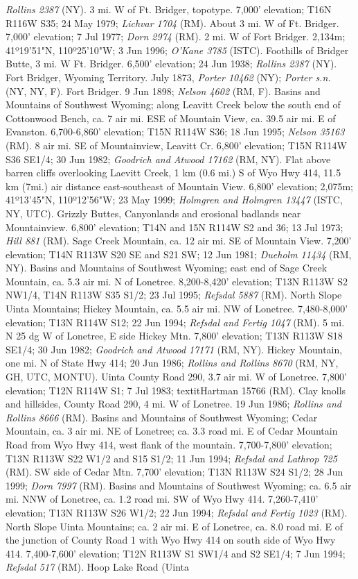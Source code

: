 \textit{Rollins 2387} (NY). 3 mi. W of Ft. Bridger, topotype.	7,000' elevation; T16N R116W S35; 24 May 1979; \textit{Lichvar 1704} (RM).  About 3 mi. W of Ft. Bridger. 7,000' elevation;	7 Jul 1977; \textit{Dorn 2974} (RM).  2 mi. W of Fort Bridger. 2,134m; 41º19'51"N, 110º25'10"W; 3 Jun 1996; \textit{O'Kane 3785} (ISTC).  Foothills of Bridger Butte, 3 mi. W Ft. Bridger. 6,500' elevation; 24 Jun 1938; \textit{Rollins 2387} (NY).  Fort Bridger, Wyoming Territory. July 1873, \textit{Porter 10462} (NY); \textit{Porter s.n.} (NY, NY, F).  Fort Bridger. 9 Jun 1898; \textit{Nelson 4602} (RM, F).  Basins and Mountains of Southwest Wyoming; along Leavitt Creek below the south end of Cottonwood Bench, ca. 7 air mi. ESE of Mountain View, ca. 39.5 air mi. E of Evanston.	6,700-6,860' elevation; T15N R114W S36; 18 Jun 1995; \textit{Nelson 35163} (RM).  8 air mi. SE of Mountainview, Leavitt Cr. 6,800' elevation; T15N R114W S36 SE1/4; 30 Jun 1982; \textit{Goodrich and Atwood 17162} (RM, NY).  Flat above barren cliffs overlooking Laevitt Creek, 1 km (0.6 mi.) S of Wyo Hwy 414, 11.5 km (7mi.) air distance east-southeast of Mountain View. 6,800' elevation; 2,075m; 41º13'45"N, 110º12'56"W; 23 May 1999; \textit{Holmgren and Holmgren 13447} (ISTC, NY, UTC).  Grizzly Buttes, Canyonlands and erosional badlands near Mountainview. 6,800' elevation;	T14N and 15N R114W S2 and 36; 13 Jul 1973; \textit{Hill 881} (RM).  Sage Creek Mountain, ca. 12 air mi. SE of Mountain View. 7,200' elevation; T14N R113W S20 SE and S21 SW; 12 Jun 1981; \textit{Dueholm 11434} (RM, NY).  Basins and Mountains of Southwest Wyoming; east end of Sage Creek Mountain, ca. 5.3 air mi. N of Lonetree. 8,200-8,420' elevation; T13N R113W S2 NW1/4, T14N R113W S35 S1/2; 23 Jul 1995; \textit{Refsdal 5887} (RM).  North Slope Uinta Mountains; Hickey Mountain, ca. 5.5 air mi. NW of Lonetree. 7,480-8,000' elevation; T13N R114W S12; 22 Jun 1994; \textit{Refsdal and Fertig 1047} (RM).  5 mi. N 25 dg W of Lonetree, E side Hickey Mtn. 7,800' elevation; T13N R113W S18 SE1/4; 30 Jun 1982; \textit{Goodrich and Atwood 17171} (RM, NY).  Hickey Mountain, one mi. N of State Hwy 414; 20 Jun 1986; \textit{Rollins and Rollins 8670} (RM, NY, GH, UTC, MONTU).  Uinta County Road 290, 3.7 air mi. W of Lonetree. 7,800' elevation; T12N R114W S1; 7 Jul 1983; textit{Hartman 15766} (RM).  Clay knolls and hillsides, County Road 290, 4 mi. W of Lonetree. 19 Jun 1986; \textit{Rollins and Rollins 8666} (RM).  Basins and Mountains of Southwest Wyoming; Cedar Mountain, ca. 3 air mi. NE of Lonetree; ca. 3.3 road mi. E of Cedar Mountain Road from Wyo Hwy 414, west flank of the mountain. 7,700-7,800' elevation; T13N R113W S22 W1/2 and S15 S1/2; 11 Jun 1994; \textit{Refsdal and Lathrop 725} (RM).  SW side of Cedar Mtn. 7,700' elevation; T13N R113W S24 S1/2; 28 Jun 1999; \textit{Dorn 7997} (RM).  Basins and Mountains of Southwest Wyoming; ca. 6.5 air mi. NNW of Lonetree, ca. 1.2 road mi. SW of Wyo Hwy 414. 7,260-7,410' elevation; T13N R113W S26 W1/2; 22 Jun 1994; \textit{Refsdal and Fertig 1023} (RM).  North Slope Uinta Mountains; ca. 2 air mi. E of Lonetree, ca. 8.0 road mi. E of the junction of County Road 1 with Wyo Hwy 414 on south side of Wyo Hwy 414. 7,400-7,600' elevation; T12N R113W S1 SW1/4 and S2 SE1/4; 7 Jun 1994; \textit{Refsdal 517} (RM).  Hoop Lake Road (Uinta 